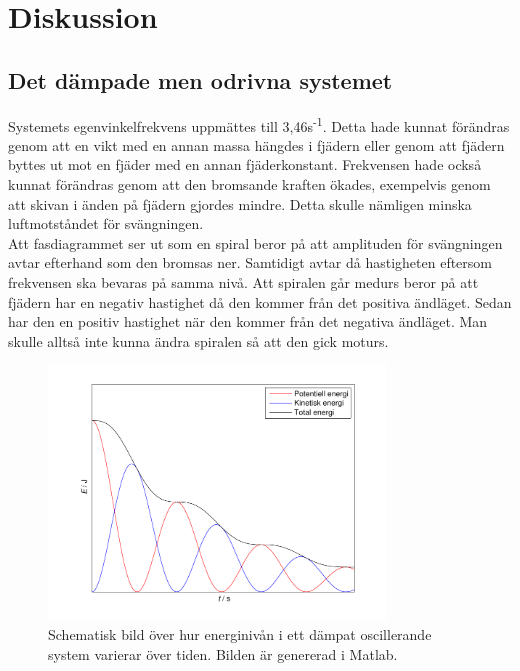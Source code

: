 \documentclass[a4paper,10pt]{article}
\begin{document}
\section{Diskussion}
\subsection{Det dämpade men odrivna systemet}
Systemets egenvinkelfrekvens uppmättes till 3,46s\textsuperscript{-1}. Detta hade kunnat förändras genom att en vikt med en annan massa hängdes i fjädern eller genom att fjädern byttes ut mot en fjäder med en annan fjäderkonstant. Frekvensen hade också kunnat förändras genom att den bromsande kraften ökades, exempelvis genom att skivan i änden på fjädern gjordes mindre. Detta skulle nämligen minska luftmotståndet för svängningen.\\
\indent Att fasdiagrammet ser ut som en spiral beror på att amplituden för svängningen avtar efterhand som den bromsas ner. Samtidigt avtar då hastigheten eftersom frekvensen ska bevaras på samma nivå. Att spiralen går medurs beror på att fjädern har en negativ hastighet då den kommer från det positiva ändläget. Sedan har den en positiv hastighet när den kommer från det negativa ändläget. Man skulle alltså inte kunna ändra spiralen så att den gick moturs.
\begin{figure}[H]
\centering
\includegraphics[width=0.8\textwidth]{../bilder/energigraf_uppg1_ideal.pdf}
\caption{Schematisk bild över hur energinivån i ett dämpat oscillerande system varierar över tiden. Bilden är genererad i Matlab.}
\end{figure}
\end{document}
